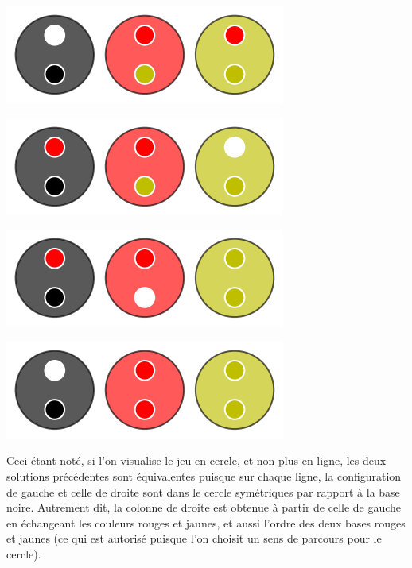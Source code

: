 \begin{multicols}{2}
    \columnbreak
    \begin{center}   %
        \includegraphics[scale=0.25]{content/optimal/tree_sol/no_unicity/sol_1/000.png}

        \includegraphics[scale=0.25]{content/optimal/tree_sol/no_unicity/sol_2/001.png}

        \includegraphics[scale=0.25]{content/optimal/tree_sol/no_unicity/sol_2/002.png}

        \includegraphics[scale=0.25]{content/optimal/tree_sol/no_unicity/sol_1/003.png}
    \end{center}
\end{multicols}

Ceci étant noté, si l'on visualise le jeu en cercle, et non plus en ligne, les deux solutions précédentes sont équivalentes puisque sur chaque ligne, la configuration de gauche et celle de droite sont dans le cercle symétriques par rapport à la base noire.
Autrement dit, la colonne de droite est obtenue à partir de celle de gauche en échangeant les couleurs rouges et jaunes, et aussi l'ordre des deux bases rouges et jaunes (ce qui est autorisé puisque l'on choisit un sens de parcours pour  le cercle).

